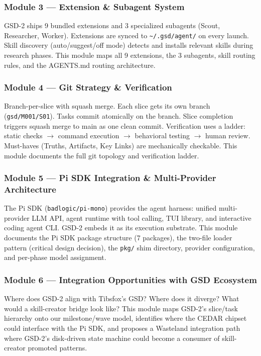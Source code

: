 \documentclass[11pt,letterpaper]{article}
\begin{document}
\subsubsection{Module 3 — Extension \& Subagent System}

GSD-2 ships 9 bundled extensions and 3 specialized subagents (Scout, Researcher, Worker). Extensions are synced to \texttt{\textasciitilde/.gsd/agent/} on every launch. Skill discovery (auto/suggest/off mode) detects and installs relevant skills during research phases. This module maps all 9 extensions, the 3 subagents, skill routing rules, and the AGENTS.md routing architecture.

\subsubsection{Module 4 — Git Strategy \& Verification}

Branch-per-slice with squash merge. Each slice gets its own branch (\texttt{gsd/M001/S01}). Tasks commit atomically on the branch. Slice completion triggers squash merge to main as one clean commit. Verification uses a ladder: static checks $\rightarrow$ command execution $\rightarrow$ behavioral testing $\rightarrow$ human review. Must-haves (Truths, Artifacts, Key Links) are mechanically checkable. This module documents the full git topology and verification ladder.

\subsubsection{Module 5 --- Pi SDK Integration \& Multi-Provider Architecture}

The Pi SDK (\texttt{badlogic/pi-mono}) provides the agent harness: unified multi-provider LLM API, agent runtime with tool calling, TUI library, and interactive coding agent CLI. GSD-2 embeds it as its execution substrate. This module documents the Pi SDK package structure (7 packages), the two-file loader pattern (critical design decision), the \texttt{pkg/} shim directory, provider configuration, and per-phase model assignment.

\subsubsection{Module 6 --- Integration Opportunities with GSD Ecosystem}

Where does GSD-2 align with Tibsfox's GSD? Where does it diverge? What would a skill-creator bridge look like? This module maps GSD-2's slice/task hierarchy onto our milestone/wave model, identifies where the CEDAR chipset could interface with the Pi SDK, and proposes a Wasteland integration path where GSD-2's disk-driven state machine could become a consumer of skill-creator promoted patterns.
\end{document}
